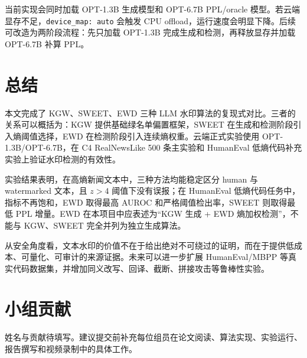 \documentclass{SYSUReport}
\begin{document}
当前实现会同时加载 OPT-1.3B 生成模型和 OPT-6.7B PPL/oracle 模型。若云端显存不足，\texttt{device\_map: auto} 会触发 CPU offload，运行速度会明显下降。后续可改造为两阶段流程：先只加载 OPT-1.3B 完成生成和检测，再释放显存并加载 OPT-6.7B 补算 PPL。

\section{总结}
本文完成了 KGW、SWEET、EWD 三种 LLM 水印算法的复现式对比。三者的关系可以概括为：KGW 提供基础绿名单偏置框架，SWEET 在生成和检测阶段引入熵阈值选择，EWD 在检测阶段引入连续熵权重。云端正式实验使用 OPT-1.3B/OPT-6.7B，在 C4 RealNewsLike 500 条主实验和 HumanEval 低熵代码补充实验上验证水印检测的有效性。

实验结果表明，在高熵新闻文本中，三种方法均能稳定区分 human 与 watermarked 文本，且 $z>4$ 阈值下没有误报；在 HumanEval 低熵代码任务中，指标不再饱和，EWD 取得最高 AUROC 和严格阈值检出率，SWEET 则取得最低 PPL 增量。EWD 在本项目中应表述为“KGW 生成 + EWD 熵加权检测”，不能与 KGW、SWEET 完全并列为独立生成算法。

从安全角度看，文本水印的价值不在于给出绝对不可绕过的证明，而在于提供低成本、可量化、可审计的来源证据。未来可以进一步扩展 HumanEval/MBPP 等真实代码数据集，并增加同义改写、回译、截断、拼接攻击等鲁棒性实验。

\section*{小组贡献}
姓名与贡献待填写。建议提交前补充每位组员在论文阅读、算法实现、实验运行、报告撰写和视频录制中的具体工作。

\printbibliography
\end{document}
